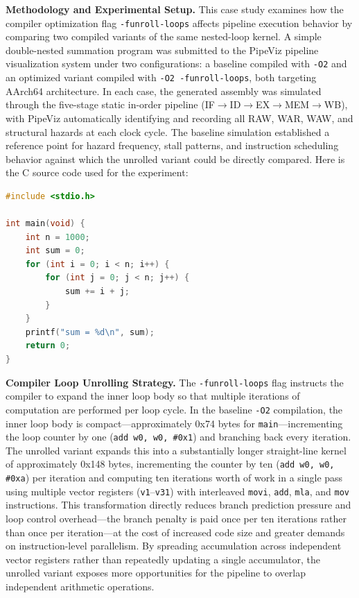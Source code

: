 \textbf{Methodology and Experimental Setup.} This case study examines how the compiler optimization flag \texttt{-funroll-loops} affects pipeline execution behavior by comparing two compiled variants of the same nested-loop kernel. A simple double-nested summation program was submitted to the PipeViz pipeline visualization system under two configurations: a baseline compiled with \texttt{-O2} and an optimized variant compiled with \texttt{-O2 -funroll-loops}, both targeting AArch64 architecture. In each case, the generated assembly was simulated through the five-stage static in-order pipeline (IF$\rightarrow$ID$\rightarrow$EX$\rightarrow$MEM$\rightarrow$WB), with PipeViz automatically identifying and recording all RAW, WAR, WAW, and structural hazards at each clock cycle. The baseline simulation established a reference point for hazard frequency, stall patterns, and instruction scheduling behavior against which the unrolled variant could be directly compared. Here is the C source code used for the experiment:

\begin{lstlisting}[language=C, basicstyle=\ttfamily\scriptsize, tabsize=2]
#include <stdio.h>

int main(void) {
    int n = 1000;
    int sum = 0;
    for (int i = 0; i < n; i++) {
        for (int j = 0; j < n; j++) {
            sum += i + j;
        }
    }
    printf("sum = %d\n", sum);
    return 0;
}
\end{lstlisting}

\textbf{Compiler Loop Unrolling Strategy.} The \texttt{-funroll-loops} flag instructs the compiler to expand the inner loop body so that multiple iterations of computation are performed per loop cycle. In the baseline \texttt{-O2} compilation, the inner loop body is compact---approximately 0x74 bytes for \texttt{main}---incrementing the loop counter by one (\texttt{add w0, w0, \#0x1}) and branching back every iteration. The unrolled variant expands this into a substantially longer straight-line kernel of approximately 0x148 bytes, incrementing the counter by ten (\texttt{add w0, w0, \#0xa}) per iteration and computing ten iterations worth of work in a single pass using multiple vector registers (\texttt{v1}--\texttt{v31}) with interleaved \texttt{movi}, \texttt{add}, \texttt{mla}, and \texttt{mov} instructions. This transformation directly reduces branch prediction pressure and loop control overhead---the branch penalty is paid once per ten iterations rather than once per iteration---at the cost of increased code size and greater demands on instruction-level parallelism. By spreading accumulation across independent vector registers rather than repeatedly updating a single accumulator, the unrolled variant exposes more opportunities for the pipeline to overlap independent arithmetic operations.

